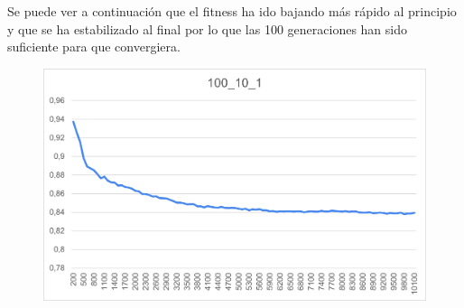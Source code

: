 \documentclass[12pt, spanish, pdftex]{UC3M_document}
\begin{document}
Se puede ver a continuación que el fitness ha ido bajando más rápido al principio y que se ha estabilizado al final por lo que las 100 generaciones han sido suficiente para que convergiera. 
\begin{figure}[H]
	{\includegraphics[scale=.75]{./img/100_10_1.jpg}}
\end{figure}
\end{document}

